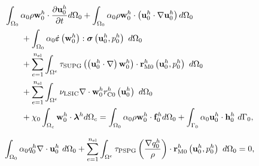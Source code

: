 \documentclass[tese_patricia]{subfiles}
\begin{document}
\begin{align}
	\begin{split}
		&\int_{\domain_0} \arlequinWFGlobal \density \wglobalh \cdot \frac{\partial\uglobalh}{\partial t} d\domain_{0} +
		\int_{\domain_0} \arlequinWFGlobal \density \wglobalh \cdot  \left(\uglobalh \cdot \nabla\uglobalh\right) d\domain_{0}  \\ 
		&\qquad+	
		\int_{\domain_{0}} \arlequinWFGlobal \strainratetensor \left(\wglobalh\right) : \stresstensor \left(\uglobalh,\pglobalh\right)\ d\domain_{0} 
		\\ 
		&\qquad+ \sum_{e=1}^{\nel} \int_{\domainE} \SUPG  \left(\left(\uglobalh \cdot \nabla \right) \wglobalh\right) \cdot \resMomGlobal\left(\uglobalh,\pglobalh \right)\  d\domain_{0} \\ 
		&\qquad+\sum_{e=1}^{\nel} \int_{\domainE} \LSIC \nabla \cdot \wglobalh \resPreGlobal 
		\left(\uglobalh\right)\  d\domain_{0} \\
		&\qquad+ \chi_{0} \int_{\domain_c} \wglobalh \cdot \lagrangeMultiplier^{h} d\domain_{c}  = \int_{\domain_0} \arlequinWFGlobal \density \wglobalh \cdot  \sbodyforce_{0}^{h} d\domain_{0} + \int_{\boundary_{0}} \arlequinWFGlobal \uglobalh \cdot \straction_{0}^{h}\ d\boundary_{0}, \\
		\label{eq:FinalSystem0est}
	\end{split}
\end{align}


\begin{align}
	\begin{split}
		&	\int_{\Omega_{0}} \alpha_0 q_0^h \nabla \cdot \mathbf{u}_0^h \ d\Omega_{0} +
		\sum_{e=1}^{n_{\mathrm{el}}} \int_{\Omega^e} \tau_{\mathrm{PSPG}} \left(\frac{\nabla q_0^h}{\rho}\right) \cdot \mathbf{r}_{\mathrm{M0}}^{h}\left(\mathbf{u}_0^h,p_0^h\right) \  d\Omega_{0} = 0, \\
		\label{eq:RC0est}
	\end{split}
\end{align}
\end{document}
